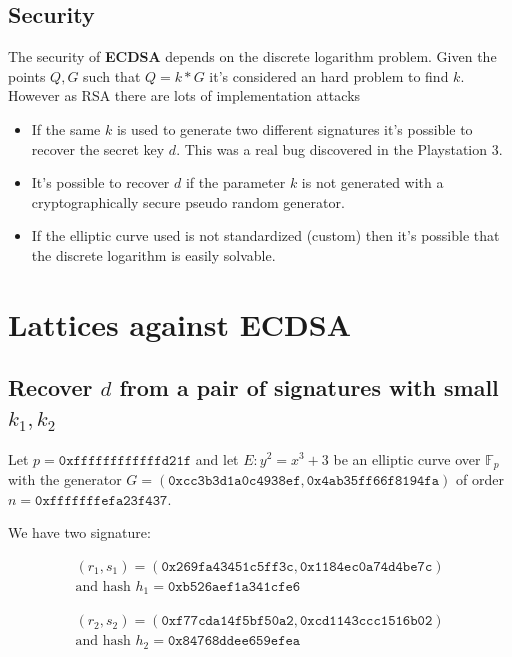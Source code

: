 \documentclass[a4paper,12pt]{report}
\newcommand{\F}{\mathbb{F}}
\begin{document}
\subsection{Security}

The security of \textbf{ECDSA} depends on the discrete logarithm problem.
Given the points $Q, G$ such that $Q = k*G$ it's considered an hard problem to find $k$.
However as RSA there are lots of implementation attacks

\begin{itemize}
    \item If the same $k$ is used to generate two different signatures it's possible to recover the secret key $d$. This was a real bug 
        discovered in the Playstation 3.
    \item It's possible to recover $d$ if the parameter $k$ is not generated with a cryptographically secure pseudo random generator.
    \item If the elliptic curve used is not standardized (custom) then it's possible that the discrete logarithm is easily solvable.
\end{itemize}

\section{Lattices against ECDSA}

\subsection{Recover $d$ from a pair of signatures with small $k_1, k_2$}

Let $p = \texttt{0xffffffffffffd21f}$ and let $E: y^2 = x^3 + 3$ be an elliptic curve over $\F_p$ with the generator
$G = (\texttt{0xcc3b3d1a0c4938ef}, \texttt{0x4ab35ff66f8194fa})$ of order $n = \texttt{0xfffffffefa23f437}$.

\vspace*{10px}

We have two signature:

\[
    \begin{array}{c}
        (r_1, s_1) = (\texttt{0x269fa43451c5ff3c}, \texttt{0x1184ec0a74d4be7c}) \\
        \text{and hash } h_1 = \texttt{0xb526aef1a341cfe6}
    \end{array}
\]

\[
    \begin{array}{c}
        (r_2, s_2) = (\texttt{0xf77cda14f5bf50a2}, \texttt{0xcd1143ccc1516b02}) \\ 
        \text{and hash } h_2 = \texttt{0x84768ddee659efea}
    \end{array}
\]
\end{document}
